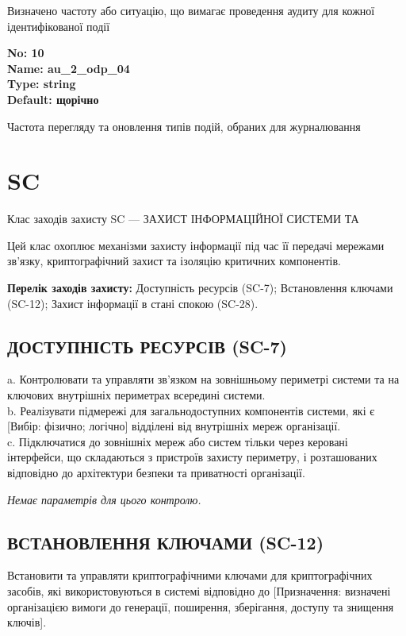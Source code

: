 \documentclass{article}
\begin{document}
{\footnotesize Визначено частоту або ситуацію, що вимагає проведення аудиту для кожної ідентифікованої події}


{\footnotesize\bfseries
No: 10\\
Name: au\_\allowbreak{}2\_\allowbreak{}odp\_\allowbreak{}04\\
Type: string\\
Default: \textquotedbl{}щорічно\textquotedbl{}
}

{\footnotesize Частота перегляду та оновлення типів подій, обраних для журналювання}




\section{SC}
Клас заходів захисту SC --- ЗАХИСТ ІНФОРМАЦІЙНОЇ СИСТЕМИ ТА

Цей клас охоплює механізми захисту інформації під час її передачі мережами зв'язку, криптографічний захист та ізоляцію критичних компонентів.

\textbf{Перелік заходів захисту:} Доступність ресурсів (SC-7); Встановлення ключами (SC-12); Захист інформації в стані спокою (SC-28).

\subsection{ДОСТУПНІСТЬ РЕСУРСІВ (SC-7)}
a. Контролювати та управляти зв'язком на зовнішньому периметрі системи та на ключових внутрішніх периметрах всередині системи.\\ 
b. Реалізувати підмережі для загальнодоступних компонентів системи, які є [Вибір: фізично; логічно] відділені від внутрішніх мереж організації.\\ 
c. Підключатися до зовнішніх мереж або систем тільки через керовані інтерфейси, що складаються з пристроїв захисту периметру, і розташованих відповідно до архітектури безпеки та приватності організації.

\vspace{10pt}
\textit{Немає параметрів для цього контролю.}
\vspace{10pt}


\subsection{ВСТАНОВЛЕННЯ КЛЮЧАМИ (SC-12)}
Встановити та управляти криптографічними ключами для криптографічних засобів, які використовуються в системі відповідно до [Призначення: визначені організацією вимоги до генерації, поширення, зберігання, доступу та знищення ключів].
\end{document}
